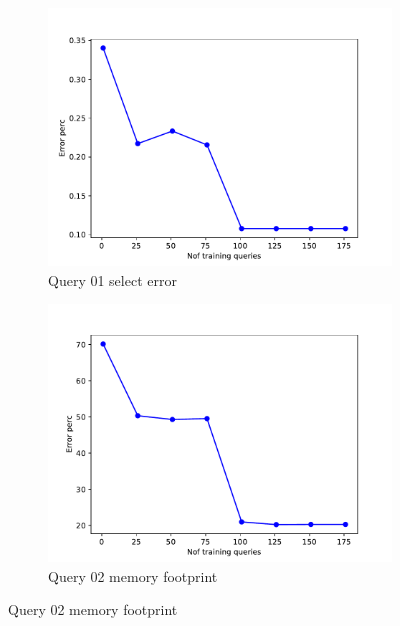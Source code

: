 \begin{figure}[!htb]
  \begin{subfigure}[t]{0.5\textwidth}
    \includegraphics[scale=0.4]{figs/tpch10/tpch10_sel01_error.pdf}
    \caption{Query 01 select error}
    \label{fig:tpch_sel01}
  \end{subfigure}
  \begin{subfigure}[t]{0.5\textwidth}
    \includegraphics[scale=0.4]{figs/tpch10/tpch10_sel02_error.pdf}
    \caption{Query 02 memory footprint}
    \label{fig:tpch_sel02}
   \end{subfigure}


\end{figure}
